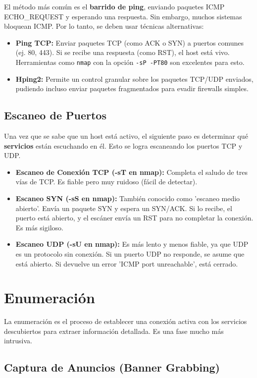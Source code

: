 \documentclass[12pt,a4paper]{article}
\begin{document}
El método más común es el \textbf{barrido de ping}, enviando paquetes ICMP ECHO\_REQUEST y esperando una respuesta. Sin embargo, muchos sistemas bloquean ICMP. Por lo tanto, se deben usar técnicas alternativas:
\begin{itemize}
    \item \textbf{Ping TCP:} Enviar paquetes TCP (como ACK o SYN) a puertos comunes (ej. 80, 443). Si se recibe una respuesta (como RST), el host está vivo. Herramientas como \texttt{nmap} con la opción \texttt{-sP -PT80} son excelentes para esto.
    \item \textbf{Hping2:} Permite un control granular sobre los paquetes TCP/UDP enviados, pudiendo incluso enviar paquetes fragmentados para evadir firewalls simples.
\end{itemize}

\subsection{Escaneo de Puertos}

Una vez que se sabe que un host está activo, el siguiente paso es determinar qué \textbf{servicios} están escuchando en él. Esto se logra escaneando los puertos TCP y UDP.
\begin{itemize}
    \item \textbf{Escaneo de Conexión TCP (-sT en nmap):} Completa el saludo de tres vías de TCP. Es fiable pero muy ruidoso (fácil de detectar).
    \item \textbf{Escaneo SYN (-sS en nmap):} También conocido como 'escaneo medio abierto'. Envía un paquete SYN y espera un SYN/ACK. Si lo recibe, el puerto está abierto, y el escáner envía un RST para no completar la conexión. Es más sigiloso.
    \item \textbf{Escaneo UDP (-sU en nmap):} Es más lento y menos fiable, ya que UDP es un protocolo sin conexión. Si un puerto UDP no responde, se asume que está abierto. Si devuelve un error 'ICMP port unreachable', está cerrado.
\end{itemize}

\section{Enumeración}

La enumeración es el proceso de establecer una conexión activa con los servicios descubiertos para extraer información detallada. Es una fase mucho más intrusiva.

\subsection{Captura de Anuncios (Banner Grabbing)}
\end{document}

